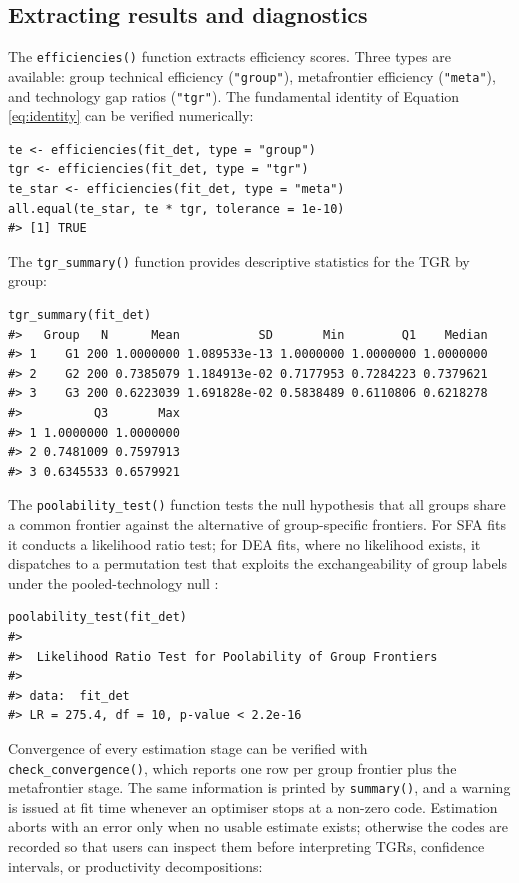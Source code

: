 \subsection{Extracting results and diagnostics}\label{sec:extracting-results}

The \texttt{efficiencies()} function extracts efficiency scores. Three types are
available: group technical efficiency (\texttt{"group"}), metafrontier efficiency
(\texttt{"meta"}), and technology gap ratios (\texttt{"tgr"}). The fundamental identity
of Equation \eqref{eq:identity} can be verified numerically:

\begin{verbatim}
te <- efficiencies(fit_det, type = "group")
tgr <- efficiencies(fit_det, type = "tgr")
te_star <- efficiencies(fit_det, type = "meta")
all.equal(te_star, te * tgr, tolerance = 1e-10)
#> [1] TRUE
\end{verbatim}

The \texttt{tgr\_summary()} function provides descriptive statistics for the TGR by
group:

\begin{verbatim}
tgr_summary(fit_det)
#>   Group   N      Mean           SD       Min        Q1    Median
#> 1    G1 200 1.0000000 1.089533e-13 1.0000000 1.0000000 1.0000000
#> 2    G2 200 0.7385079 1.184913e-02 0.7177953 0.7284223 0.7379621
#> 3    G3 200 0.6223039 1.691828e-02 0.5838489 0.6110806 0.6218278
#>          Q3       Max
#> 1 1.0000000 1.0000000
#> 2 0.7481009 0.7597913
#> 3 0.6345533 0.6579921
\end{verbatim}

The \texttt{poolability\_test()} function tests the null hypothesis that all groups
share a common frontier against the alternative of group-specific
frontiers. For SFA fits it conducts a likelihood ratio test; for DEA fits,
where no likelihood exists, it dispatches to a permutation test that
exploits the exchangeability of group labels under the pooled-technology
null \citep{simar2007, kneip2016}:

\begin{verbatim}
poolability_test(fit_det)
#> 
#>  Likelihood Ratio Test for Poolability of Group Frontiers
#> 
#> data:  fit_det
#> LR = 275.4, df = 10, p-value < 2.2e-16
\end{verbatim}

Convergence of every estimation stage can be verified with
\texttt{check\_convergence()}, which reports one row per group frontier plus the
metafrontier stage. The same information is printed by \texttt{summary()}, and a
warning is issued at fit time whenever an optimiser stops at a non-zero
code. Estimation aborts with an error only when no usable estimate exists;
otherwise the codes are recorded so that users can inspect them before
interpreting TGRs, confidence intervals, or productivity decompositions:

